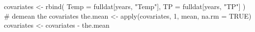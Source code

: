 \begin{Schunk}
\begin{Sinput}
 covariates <- rbind(
   Temp = fulldat[years, "Temp"],
   TP = fulldat[years, "TP"]
 )
 # demean the covariates
 the.mean <- apply(covariates, 1, mean, na.rm = TRUE)
 covariates <- covariates - the.mean
\end{Sinput}
\end{Schunk}
